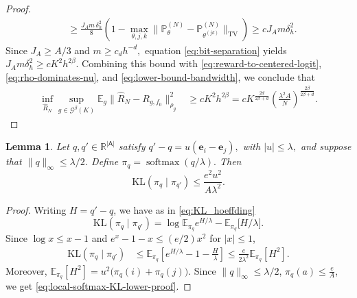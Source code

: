 \documentclass{article}
\newtheorem{lemma}[proposition]{Lemma}
\theoremstyle{definition}
\theoremstyle{remark}
\theoremstyle{plain}
\newcommand{\E}{\mathbb{E}}
\newcommand{\KL}{\mathrm{KL}}
\numberwithin{equation}{section}
\begin{document}
\begin{proof}
\begin{align}
    &\geq
    \frac{
        J_A m\,\delta_h^2
    }{8}
    \left(
        1-
        \max_{\theta,j,k}
        \|
            \mathbb P_\theta^{(N)}
            -
            \mathbb P_{\theta^{(jk)}}^{(N)}
        \|_{\mathrm{TV}}
    \right) \geq
    cJ_A m\delta_h^2.
\label{eq:Assouad-conclusion}
\end{align}
Since \(J_A\geq A/3\) 
and \(m\geq c_dh^{-d},\)
equation \eqref{eq:bit-separation} yields \( J_A m\delta_h^2
    \geq
    cK^2h^{2\beta}.\)
Combining this bound with
\eqref{eq:reward-to-centered-logit},
\eqref{eq:rho-dominates-nu}, and
\eqref{eq:lower-bound-bandwidth}, we conclude that
\[
\begin{aligned}
    \inf_{\widehat R_N}
    \sup_{g\in\mathcal G^\beta(K)}
    \mathbb E_g
    \|
        \widehat R_N-R_{g,f_0}
    \|_{\rho_g}^2
    &\geq
    cK^2h^{2\beta}=
    c
    K^{\frac{2d}{2\beta+d}}
    \left(
        \frac{\lambda^2A}{N}
    \right)^{\frac{2\beta}{2\beta+d}}.
\end{aligned}
\]
\end{proof}

\begin{lemma}
\label{eq:kl_softmax_e}
    Let \(q,q'\in\mathbb R^{|\mathsf A|}\)  satisfy
\( q'-q
    =
    u(\mathbf e_i- \mathbf e_j),
    \) with \(
    |u|\leq\lambda,\)
and suppose that \(\|q\|_\infty\leq\lambda/2\). Define
\(
    \pi_q = \operatorname{softmax}(q/\lambda).
\)
Then
\begin{equation}
\label{eq:local-softmax-KL-lower-proof}
    \KL(\pi_q\mid\pi_{q'})
    \leq
    \frac{e^2u^2}{A\lambda^2}.
\end{equation}
\end{lemma}
\begin{proof}
Writing \(H=q'-q\), we have as in \eqref{eq:KL_hoeffding}
\[
    \KL(\pi_q\mid\pi_{q'})
    =
    \log\E_{\pi_q}e^{H/\lambda}
    -
    \E_{\pi_q}\big[H/{\lambda}\big].
\]
Since \(\log x\leq x-1\) and
\(e^x-1-x\leq(e/2)x^2\) for \(|x|\leq1\),
\[
\begin{aligned}
    \KL(\pi_q\mid\pi_{q'})
    &\leq
    \E_{\pi_q}
    \left[
        e^{H/\lambda}
        -
        1
        -
        \frac{H}{\lambda}
    \right]
    \leq
    \frac{e}{2\lambda^2}
    \E_{\pi_q}[H^2].
\end{aligned}
\]
Moreover, 
\(    \E_{\pi_q}[H^2]
    =
    u^2\bigl(\pi_q(i)+\pi_q(j)\bigr).\)
Since \(\|q\|_\infty\leq\lambda/2\), \(\pi_q(a)\leq\frac{e}{A}\), we get \eqref{eq:local-softmax-KL-lower-proof}.
\end{proof}
\end{document}

